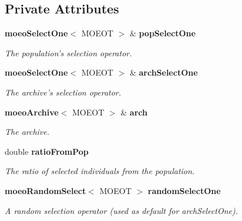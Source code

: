 \subsection*{Private Attributes}
\begin{CompactItemize}
\item 
{\bf moeo\-Select\-One}$<$ MOEOT $>$ \& {\bf pop\-Select\-One}\label{classmoeoSelectFromPopAndArch_e16fb61bf9c115b0a34528e512d30ac6}

\begin{CompactList}\small\item\em The population's selection operator. \item\end{CompactList}\item 
{\bf moeo\-Select\-One}$<$ MOEOT $>$ \& {\bf arch\-Select\-One}\label{classmoeoSelectFromPopAndArch_a34f3871b3a9f94614a15c381c2fa570}

\begin{CompactList}\small\item\em The archive's selection operator. \item\end{CompactList}\item 
{\bf moeo\-Archive}$<$ MOEOT $>$ \& {\bf arch}\label{classmoeoSelectFromPopAndArch_e87de22341f2225ea94ee2895a7eb4a6}

\begin{CompactList}\small\item\em The archive. \item\end{CompactList}\item 
double {\bf ratio\-From\-Pop}\label{classmoeoSelectFromPopAndArch_78a1e18111b46c447c86a0f77484d970}

\begin{CompactList}\small\item\em The ratio of selected individuals from the population. \item\end{CompactList}\item 
{\bf moeo\-Random\-Select}$<$ MOEOT $>$ {\bf random\-Select\-One}\label{classmoeoSelectFromPopAndArch_d6094492eed214e3bdb0330620a5890a}

\begin{CompactList}\small\item\em A random selection operator (used as default for arch\-Select\-One). \item\end{CompactList}\end{CompactItemize}


